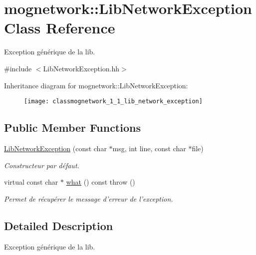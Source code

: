 \hypertarget{classmognetwork_1_1_lib_network_exception}{\section{mognetwork\-:\-:Lib\-Network\-Exception Class Reference}
\label{classmognetwork_1_1_lib_network_exception}
}


Exception générique de la lib.  




{\ttfamily \#include $<$Lib\-Network\-Exception.\-hh$>$}

Inheritance diagram for mognetwork\-:\-:Lib\-Network\-Exception\-:\begin{figure}[H]
\begin{center}
\leavevmode
\texttt{[image: classmognetwork\_1\_1\_lib\_network\_exception]}
\end{center}
\end{figure}
\subsection*{Public Member Functions}
\begin{DoxyCompactItemize}
\item 
\hyperlink{classmognetwork_1_1_lib_network_exception_af74972d2d7160710b8faaccb01f6455c}{Lib\-Network\-Exception} (const char $\ast$msg, int line, const char $\ast$file)
\begin{DoxyCompactList}\small\item\em Constructeur par défaut. \end{DoxyCompactList}\item 
virtual const char $\ast$ \hyperlink{classmognetwork_1_1_lib_network_exception_a65c5c92d2bf25a9c4cd8a0322c36e54a}{what} () const   throw ()
\begin{DoxyCompactList}\small\item\em Permet de récupérer le message d'erreur de l'exception. \end{DoxyCompactList}\end{DoxyCompactItemize}


\subsection{Detailed Description}
Exception générique de la lib. 

